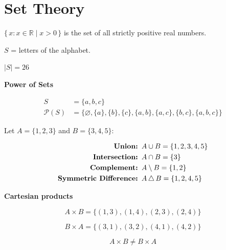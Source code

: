 \documentclass[../../2_specs]{subfiles}
\begin{document}

% 

\chapter{Set Theory}

$\{\, x : x \in \mathbb{R} \mid x > 0 \,\}$ is the set of all strictly positive real numbers.

$S$ = letters of the alphabet.

$|S| = 26$

\textbf{Power of Sets}

\begin{align*}
S &= \{a, b, c\} \\
\mathcal{P}(S) &= \{\varnothing, \{a\}, \{b\}, \{c\}, \{a,b\}, \{a,c\}, \{b,c\}, \{a,b,c\}\}
\end{align*}

Let $A = \{1, 2, 3\}$ and $B = \{3, 4, 5\}$:

\begin{align*}
    \text{\textbf{Union: }} & A \cup B = \{1, 2, 3, 4, 5\} \\
    \text{\textbf{Intersection: }} & A \cap B = \{3\} \\
    \text{\textbf{Complement: }} & A \setminus B = \{1, 2\} \\
    \text{\textbf{Symmetric Difference: }} & A \,\triangle\, B = \{1, 2, 4, 5\}
\end{align*}

\textbf{Cartesian products}

\[
A \times B = \{(1,3), (1,4), (2,3), (2,4)\}
\]

\[
B \times A = \{(3,1), (3,2), (4,1), (4,2)\}
\]

\[
A \times B \neq B \times A
\]
\end{document}
